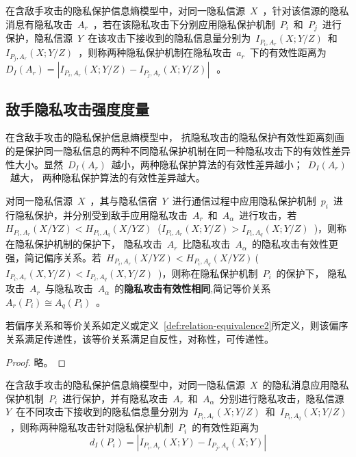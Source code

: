 \begin{definition}[抗隐私攻击的隐私保护有效性距离]
	\label{def:privacy-preserving-performance-distance}
	在含敌手攻击的隐私保护信息熵模型中，对同一隐私信源~$X$~，针对该信源的隐私消息有隐私攻击~$A_{r}$~，若在该隐私攻击下分别应用隐私保护机制~$P_{i}$~和~$P_{j}$~进行保护，隐私信源~$Y$~在该攻击下接收到的隐私信息量分别为~$I_{P_{i},A_{r}}(X;Y/Z)$~和~$I_{P_{j},A_{r}}(X;Y/Z)$~，则称两种隐私保护机制在隐私攻击~$a_{r}$~下的有效性距离为~$D_{I}(A_{r})=\left | I_{P_{i},A_{r}}(X;Y/Z)-I_{P_{j},A_{r}}(X;Y/Z) \right |~$~。
\end{definition}

\subsection{敌手隐私攻击强度度量}
在含敌手攻击的隐私保护信息熵模型中， 抗隐私攻击的隐私保护有效性距离刻画的是保护同一隐私信息的两种不同隐私保护机制在同一种隐私攻击下的有效性差异性大小。显然~$D_{I}(A_{r})$~越小，两种隐私保护算法的有效性差异越小；~$D_{I}(A_{r})$~越大， 两种隐私保护算法的有效性差异越大。

\begin{definition}
	\label{def:relation-equivalence2}
	 对同一隐私信源~$X$~，其与隐私信宿~$Y$~进行通信过程中应用隐私保护机制~$p_{i}$~进行隐私保护，并分别受到敌手应用隐私攻击~$A_{r}$~和~$A_{\alpha }$~进行攻击，若~${{H}_{{{P}_{i}},{{A}_{r}}}}(X/YZ)<{{H}_{{{P}_{i}},{{A}_{q}}}}(X/YZ)~$ (${{I}_{{{P}_{i}},{{A}_{r}}}}(X;Y/Z)>{{I}_{{{P}_{i}},{{A}_{q}}}}(X;Y/Z)$~)，则称在隐私保护机制的保护下， 隐私攻击~$A_{r}$~比隐私攻击~$A_{\alpha }$~的隐私攻击有效性更强，简记偏序关系。若~$H_{P_{i},A_{r}}(X/YZ)<H_{P_{i},A_{q}}(X/YZ)~$(~$I_{P_{i},A_{r}}(X,Y/Z)<I_{P_{i},A_{q}}(X,Y/Z)$~)，则称在隐私保护机制~$P_{i}$~的保护下， 隐私攻击~$A_{r}$~与隐私攻击~$A_{\alpha }$~的\textbf{隐私攻击有效性相同},简记等价关系~$A_{r}(P_{i})\cong A_{q}(P_{i})$~。
\end{definition}

\begin{theorem}
	\label{thm:relation-equivalence}
	若偏序关系和等价关系如定义\label{def:relation-equivalence1}或定义~\ref{def:relation-equivalence2}所定义，则该偏序关系满足传递性，该等价关系满足自反性，对称性，可传递性。 
\end{theorem}

\begin{proof}
 略。
\end{proof}


\begin{definition}[隐私攻击有效性距离]
	\label{def:privacy-attack-distance}
	在含敌手攻击的隐私保护信息熵模型中，对同一隐私信源~$X$~的隐私消息应用隐私保护机制~$P_{i}$~进行保护，并有隐私攻击~$A_{r}$~和~$A_{\alpha}$~分别进行隐私攻击，隐私信源~$Y$~在不同攻击下接收到的隐私信息量分别为~$I_{P_{i},A_{r}}(X;Y/Z)$~和~$I_{P_{i},A_{q}}(X;Y/Z)$~，则称两种隐私攻击针对隐私保护机制~$P_{i}$~的有效性距离为
\begin{equation}
d_{I}(P_{i})=\left | I_{P_{i},A_{r}}(X;Y)-I_{P_{j},A_{q}}(X;Y) \right |
\end{equation}
\end{definition}

